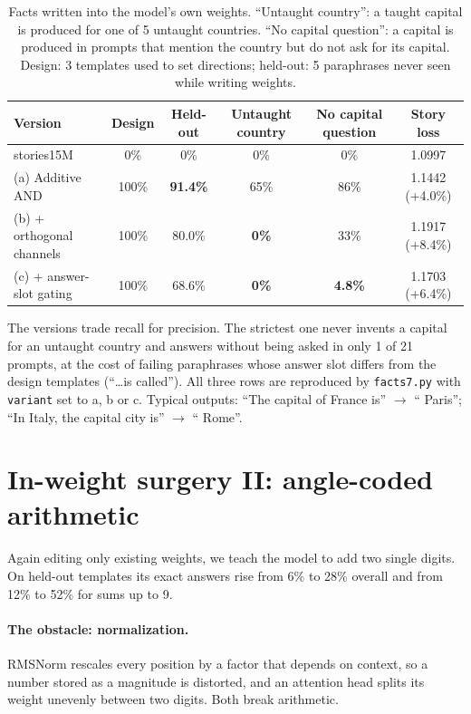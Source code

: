 \documentclass[11pt]{article}
\begin{document}
\begin{table}[h]
\centering
\small
\setlength{\tabcolsep}{4pt}\begin{tabular}{lccccc}
\toprule
Version & Design & Held-out & Untaught country & No capital question & Story loss \\
\midrule
stories15M & 0\% & 0\% & 0\% & 0\% & 1.0997 \\
(a) Additive AND & 100\% & \textbf{91.4\%} & 65\% & 86\% & 1.1442 (+4.0\%) \\
(b) + orthogonal channels & 100\% & 80.0\% & \textbf{0\%} & 33\% & 1.1917 (+8.4\%) \\
(c) + answer-slot gating & 100\% & 68.6\% & \textbf{0\%} & \textbf{4.8\%} & 1.1703 (+6.4\%) \\
\bottomrule
\end{tabular}
\caption{Facts written into the model's own weights. ``Untaught country'': a taught capital is produced for one of 5 untaught countries. ``No capital question'': a capital is produced in prompts that mention the country but do not ask for its capital. Design: 3 templates used to set directions; held-out: 5 paraphrases never seen while writing weights.}
\end{table}

The versions trade recall for precision. The strictest one never invents a capital for an untaught country and answers without being asked in only 1 of 21 prompts, at the cost of failing paraphrases whose answer slot differs from the design templates (``\ldots is called''). All three rows are reproduced by \texttt{facts7.py} with \texttt{variant} set to a, b or c. Typical outputs: ``The capital of France is'' $\to$ `` Paris''; ``In Italy, the capital city is'' $\to$ `` Rome''.

\section{In-weight surgery II: angle-coded arithmetic}\label{sec:arith}
Again editing only existing weights, we teach the model to add two single digits. On held-out templates its exact answers rise from 6\% to 28\% overall and from 12\% to 52\% for sums up to 9.

\paragraph{The obstacle: normalization.} RMSNorm rescales every position by a factor that depends on context, so a number stored as a magnitude is distorted, and an attention head splits its weight unevenly between two digits. Both break arithmetic.
\end{document}
